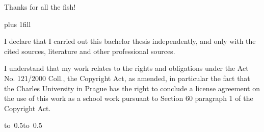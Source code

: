\newpage



\openright

\noindent
Thanks for all the fish!

\newpage


\vglue 0pt plus 1fill

\noindent
I declare that I carried out this bachelor thesis independently, and only with
the cited sources, literature and other professional sources.

\medskip\noindent
I understand that my work relates to the rights and obligations under the Act
No. 121/2000 Coll., the Copyright Act, as amended, in particular the fact that
the Charles University in Prague has the right to conclude a license agreement
on the use of this work as a school work pursuant to Section 60 paragraph 1 of
the Copyright Act.

\vspace{10mm}

\hbox{\hbox to 0.5\hbox to 0.5}

\vspace{20mm}
\newpage


